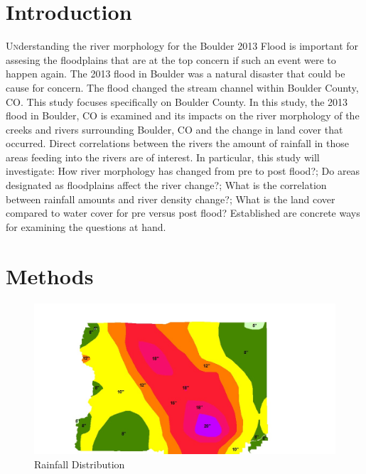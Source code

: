 \documentclass[twoside]{article}
\begin{document}
\begin{multicols}{2} %

\section{Introduction}

\lettrine[nindent=0em,lines=3]{U}nderstanding the river morphology for the Boulder 2013 Flood is important for assesing the floodplains that are at the top concern if such an event were to happen again. The 2013 flood in Boulder was a natural disaster that could be cause for concern. The flood changed the stream channel within Boulder County, CO. This study focuses specifically on Boulder County. In this study, the 2013 flood in Boulder, CO is examined and its impacts on the river morphology of the creeks and rivers surrounding Boulder, CO and the change in land cover that occurred. Direct correlations between the rivers the amount of rainfall in those areas feeding into the rivers are of interest. In particular, this study will investigate: How river morphology has changed from pre to post flood?; Do areas designated as floodplains affect the river change?; What is the correlation between rainfall amounts and river density change?; What is the land cover compared to water cover for pre versus post flood? Established are concrete ways for examining the questions at hand.

\section{Methods}

\begin{figure} %
\includegraphics[width=2\columnwidth]{project.jpg}
\caption{Rainfall Distribution\label{fig:sloth}}
\end{figure}


\end{multicols}
\end{document}
